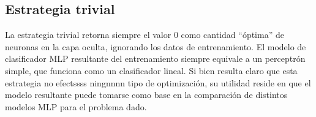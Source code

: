 %
\subsection{Estrategia trivial}
%
La estrategia trivial retorna siempre el valor 0 como cantidad
``óptima'' de neuronas en la capa oculta, ignorando los datos de
entrenamiento.
El modelo de clasificador MLP resultante del entrenamiento siempre
equivale a un perceptrón simple, que funciona como un clasificador
lineal.
Si bien resulta claro que esta estrategia no efectssss ningnnnn tipo
de optimización, su utilidad reside en que el modelo resultante puede
tomarse como base en la comparación de distintos modelos MLP para el
problema dado.
%
%
